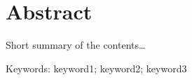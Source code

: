 

\begingroup
\let\clearpage\relax
\let\cleardoublepage\relax
\let\cleardoublepage\relax

\chapter*{Abstract} %

Short summary of the contents\dots

\bigskip

\noindent Keywords: keyword1; keyword2; keyword3

\endgroup			

\vfill
